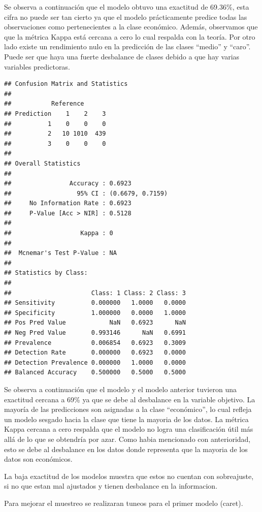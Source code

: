 \documentclass[
]{article}
\begin{document}
Se observa a continuación que el modelo obtuvo una exactitud de 69.36\%,
esta cifra no puede ser tan cierto ya que el modelo prácticamente
predice todas las observaciones como pertenecientes a la clase
económico. Además, observamos que que la métrica Kappa está cercana a
cero lo cual respalda con la teoría. Por otro lado existe un rendimiento
nulo en la predicción de las clases ``medio'' y ``caro''. Puede ser que
haya una fuerte desbalance de clases debido a que hay varias variables
predictoras.

\begin{verbatim}
## Confusion Matrix and Statistics
## 
##           Reference
## Prediction    1    2    3
##          1    0    0    0
##          2   10 1010  439
##          3    0    0    0
## 
## Overall Statistics
##                                           
##                Accuracy : 0.6923          
##                  95% CI : (0.6679, 0.7159)
##     No Information Rate : 0.6923          
##     P-Value [Acc > NIR] : 0.5128          
##                                           
##                   Kappa : 0               
##                                           
##  Mcnemar's Test P-Value : NA              
## 
## Statistics by Class:
## 
##                      Class: 1 Class: 2 Class: 3
## Sensitivity          0.000000   1.0000   0.0000
## Specificity          1.000000   0.0000   1.0000
## Pos Pred Value            NaN   0.6923      NaN
## Neg Pred Value       0.993146      NaN   0.6991
## Prevalence           0.006854   0.6923   0.3009
## Detection Rate       0.000000   0.6923   0.0000
## Detection Prevalence 0.000000   1.0000   0.0000
## Balanced Accuracy    0.500000   0.5000   0.5000
\end{verbatim}

Se observa a continuación que el modelo y el modelo anterior tuvieron
una exactitud cercana a 69\% ya que se debe al desbalance en la variable
objetivo. La mayoría de las predicciones son asignadas a la clase
``económico'', lo cual refleja un modelo sesgado hacia la clase que
tiene la mayoria de los datos. La métrica Kappa cercana a cero respalda
que el modelo no logra una clasificación útil más allá de lo que se
obtendría por azar. Como habia mencionado con anterioridad, esto se debe
al desbalance en los datos donde representa que la mayoria de los datos
son económicos.

La baja exactitud de los modelos muestra que estos no cuentan con
sobreajuste, si no que estan mal ajustados y tienen desbalance en la
informacion.

Para mejorar el muestreo se realizaran tuneos para el primer modelo
(caret).
\end{document}
